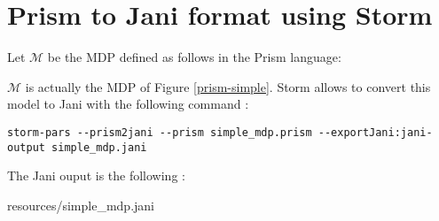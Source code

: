\addtocounter{chapter}{1}
\setcounter{section}{0}
\section{Prism to Jani format using Storm}\label{prism2jani}
Let $\mathcal{M}$ be the MDP defined as follows in the Prism language:

$\mathcal{M}$ is actually the MDP of Figure \ref{prism-simple}.
Storm allows to convert this model to Jani with the following command :
{\scriptsize
\begin{verbatim}
storm-pars --prism2jani --prism simple_mdp.prism --exportJani:jani-output simple_mdp.jani
\end{verbatim}
}
The Jani ouput is the following :

    {resources/simple_mdp.jani}

